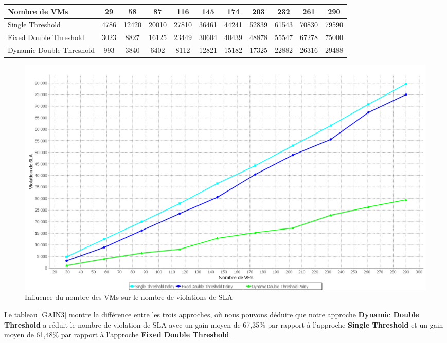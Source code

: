 \begin{onehalfspace}
\begin{center}
{\scriptsize   \begin{tabular}{|p{2.5cm}|c|c|c|c|c|c|c|c|c|c|}
\hline
      \centering     Nombre de VMs &  29& 58& 87& 116& 145& 174& 203& 232& 261& 290\\
\hline
      \centering      Single Threshold &  4786& 12420& 20010& 27810& 36461& 44241& 52839& 61543& 70830& 79590\\
\hline
      \centering      Fixed Double Threshold &  3023& 8827& 16125& 23449& 30604& 40439& 48878& 55547& 67278& 75000\\
\hline
      \centering     Dynamic Double Threshold &  993& 3840& 6402& 8112& 12821& 15182& 17325& 22882& 26316& 29488\\
\hline
\end{tabular}}
\label{tab4}
\end{center}
\clearpage
\begin{figure}[!h]
\begin{center}
\includegraphics[scale=0.35]{figures/sh3.png} 
\end{center}
\caption{Influence du nombre des VMs sur le nombre de violations de SLA}
\label{InNVMEV}
\end{figure}

Le tableau \ref{GAIN3} montre la différence entre les trois approches, où nous pouvons déduire que notre approche \textbf{Dynamic Double Threshold} a réduit le nombre de violation de SLA avec un gain moyen de 67,35\% par rapport à l'approche \textbf{Single Threshold} et un gain moyen de 61,48\% par rapport à l'approche \textbf{Fixed Double Threshold}.\\



\end{onehalfspace}
